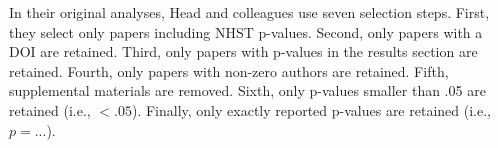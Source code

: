 In their original analyses, Head and colleagues use seven selection steps. First, they select only papers including NHST p-values. Second, only papers with a DOI are retained. Third, only papers with p-values in the results section are retained. Fourth, only papers with non-zero authors are retained. Fifth, supplemental materials are removed. Sixth, only p-values smaller than .05 are retained (i.e., $<.05$). Finally, only exactly reported p-values are retained (i.e., $p=...$).